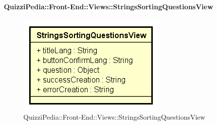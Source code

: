 \paragraph{QuizziPedia::Front-End::Views::StringsSortingQuestionsView}
\begin{figure} [ht]
	\centering
	\includegraphics[scale=0.80]{UML/Classi/Front-End/QuizziPedia_Front-end_Views_StringsSortingQuestionsView.png}
	\caption{QuizziPedia::Front-End::Views::StringsSortingQuestionsView}
\end{figure} \FloatBarrier

